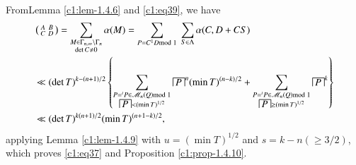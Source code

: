 \setcounter{proofofprop}{9}
\begin{proofofprop}\label{c1:proofofprop-1.4.10}
From\pageoriginale Lemma \ref{c1:lem-1.4.6} and \eqref{c1:eq39}, we have
{\fontsize{10}{12}\selectfont
\begin{align*}
&\left(\begin{smallmatrix} A & B\\ C & D
\end{smallmatrix}\right)=\sum_{\substack{M\in
    \Gamma_{n,\infty}\backslash \Gamma_{n}\\ \det C\neq
    0}}\alpha(M)=\sum_{P=C^{1}D\rm{mod} \;
  1} \; \sum_{S\in\Lambda}\alpha(C,D+CS)\\
&\ll (\det
T)^{k-(n+1)/2}\left\{\sum_{\substack{P={}^{t}P\in\mathscr{M}_{n}(Q)\rm{mod} \;
1\\ \house{P}<(\min T)^{1/2}}}{\house{P}}^{n}(\min
T)^{(n-k)/2}+\sum_{\substack{P={}^{t}P\in\mathscr{M}_{n}(Q)\rm{mod} \;
    1\\ \house{P}\geq (\min
    T)^{1/2}}}{\house{P}}^{k}\right\}\\
&\ll (\det T)^{k(n+1)/2}(\min T)^{(n+1-k)/2},
\end{align*}}\relax
applying Lemma \ref{c1:lem-1.4.9} with $u=(\min T)^{1/2}$ and $s=k-n(\geq
3/2)$, which proves \eqref{c1:eq37} and Proposition \ref{c1:prop-1.4.10}.
\end{proofofprop}

